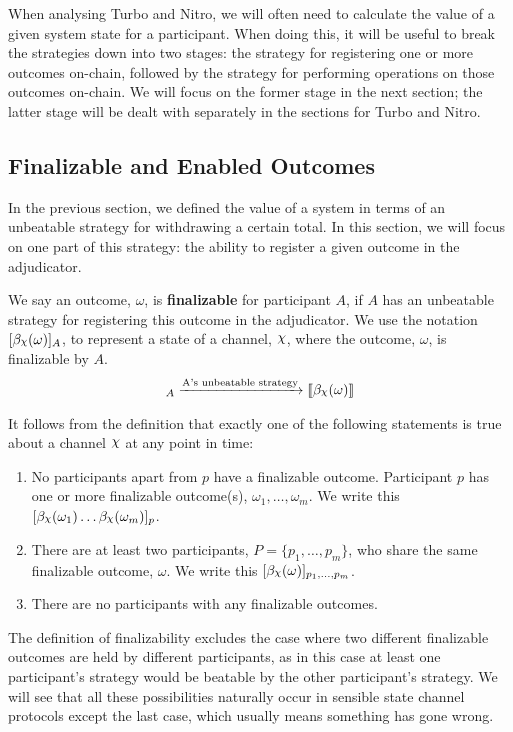 \documentclass{article}
\DeclareRobustCommand{\rchi}{{\mathpalette\irchi\relax}}
\newcommand{\irchi}[2]{\raisebox{\depth}{$#1\chi$}} %
\theoremstyle{definition}
\newcommand{\adj}[1]{\llbracket #1 \rrbracket}
\newcommand{\enf}[1]{[#1]}
\begin{document}
When analysing Turbo and Nitro, we will often need to calculate the value of a given system
state for a participant.
When doing this, it will be useful to break the strategies down into two stages: the strategy
for registering one or more outcomes on-chain, followed by the strategy for performing operations
on those outcomes on-chain.
We will focus on the former stage in the next section; the latter stage will be dealt with
separately in the sections for Turbo and Nitro.

\subsection{Finalizable and Enabled Outcomes}

In the previous section, we defined the value of a system in terms of an unbeatable strategy
for withdrawing a certain total.
In this section, we will focus on one part of this strategy: the ability to register a given
outcome in the adjudicator.

We say an outcome, $\omega$, is \textbf{finalizable} for participant $A$, if $A$ has an unbeatable
strategy for registering this outcome in the adjudicator.
We use the notation $\enf{\beta_\rchi(\omega)}_A$, to represent a state of a channel, $\rchi$,
where the outcome, $\omega$, is finalizable by $A$.
\begin{align*}
  \enf{\beta_\rchi(\omega)}_A \xrightarrow{\text{A's unbeatable strategy}} \adj{\beta_\rchi(\omega)}
\end{align*}

It follows from the definition that exactly one of the following statements is true about
a channel $\rchi$ at any point in time:
\begin{enumerate}
  \item No participants apart from $p$ have a finalizable outcome.
        Participant $p$ has one or more finalizable outcome(s), $\omega_1, \dots, \omega_m$.
        We write this $\enf{\beta_\rchi(\omega_1) \dots \beta_\rchi(\omega_m)}_p$.
  \item There are at least two participants, $P = \{p_1, \dots, p_m \}$, who share the same
        finalizable outcome, $\omega$. We write this $\enf{\beta_\rchi(\omega)}_{p_1, \dots, p_m}$.
  \item There are no participants with any finalizable outcomes.
\end{enumerate}
The definition of finalizability excludes the case where two different finalizable outcomes are held
by different participants, as in this case at least one participant's strategy would be beatable
by the other participant's strategy.
We will see that all these possibilities naturally occur in sensible state channel protocols
except the last case, which usually means something has gone wrong.
\end{document}
